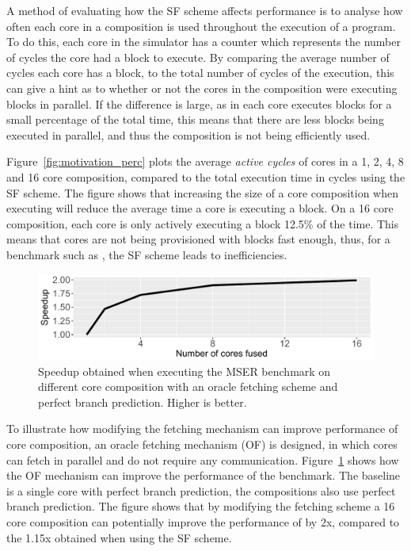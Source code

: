 A method of evaluating how the SF scheme affects performance is to analyse how often each core in a composition is used throughout the execution of a program.
To do this, each core in the simulator has a counter which represents the number of cycles the core had a block to execute.
By comparing the average number of cycles each core has a block, to the total number of cycles of the execution, this can give a hint as to whether or not the cores in the composition were executing blocks in parallel.
If the difference is large, as in each core executes blocks for a small percentage of the total time, this means that there are less blocks being executed in parallel, and thus the composition is not being efficiently used.

Figure~\ref{fig:motivation_perc} plots the average \textit{active cycles} of cores in a 1, 2, 4, 8 and 16 core composition, compared to the total execution time in cycles using the SF scheme.
The figure shows that increasing the size of a core composition when executing  will reduce the average time a core is executing a block.
On a 16 core composition, each core is only actively executing a block 12.5\% of the time.
This means that cores are not being provisioned with blocks fast enough, thus, for a benchmark such as , the SF scheme leads to inefficiencies.

\begin{figure}[t]
    \centering
    \includegraphics[width=1\textwidth]{chapter3/graphics/perfect_fetch_motiv.pdf}
    \caption{Speedup obtained when executing the MSER benchmark on different core composition with an oracle fetching scheme and perfect branch prediction. Higher is better.}
    \label{fig:motivation_fetch}
	\vspace{1em}
\end{figure}

To illustrate how modifying the fetching mechanism can improve performance of core composition, an oracle fetching mechanism (OF) is designed, in which cores can fetch in parallel and do not require any communication.
Figure~\ref{fig:motivation_fetch} shows how the OF mechanism can improve the performance of the  benchmark.
The baseline is a single core with perfect branch prediction, the compositions also use perfect branch prediction.
The figure shows that by modifying the fetching scheme a 16 core composition can potentially improve the performance of  by 2x, compared to the 1.15x obtained when using the SF scheme.


